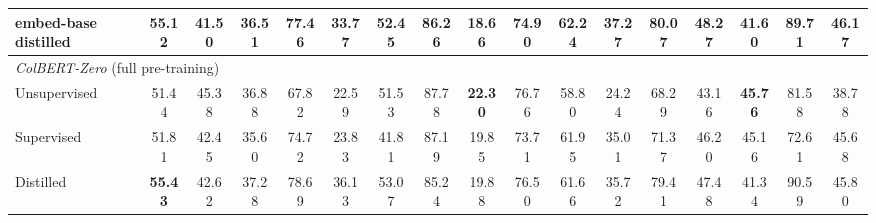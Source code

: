 \begin{table}
{\begin{tabular}{l c ccccccccccccccc}
embed-base distilled & 55.12 & 41.50 & 36.51 & 77.46 & \textbf{33.77} & 52.45 & 86.26 & 18.66 & 74.90 & \textbf{62.24} & 37.27 & \textbf{80.07} & \textbf{48.27} & 41.60 & 89.71 & \textbf{46.17} \\
\midrule
\multicolumn{17}{l}{\textit{ColBERT-Zero} (full pre-training)} \\
\midrule
Unsupervised & 51.44 & 45.38 & 36.88 & 67.82 & 22.59 & 51.53 & 87.78 & \textbf{22.30} & 76.76 & 58.80 & 24.24 & 68.29 & 43.16 & \textbf{45.76} & 81.58 & 38.78 \\
Supervised & 51.81 & 42.45 & 35.60 & 74.72 & 23.83 & 41.81 & 87.19 & 19.85 & 73.71 & 61.95 & 35.01 & 71.37 & 46.20 & 45.16 & 72.61 & 45.68 \\
Distilled & \textbf{55.43} & 42.62 & 37.28 & 78.69 & 36.13 & 53.07 & 85.24 & 19.88 & 76.50 & 61.66 & 35.72 & 79.41 & 47.48 & 41.34 & 90.59 & 45.80 \\
\bottomrule
\end{tabular}%
}
\end{table}


